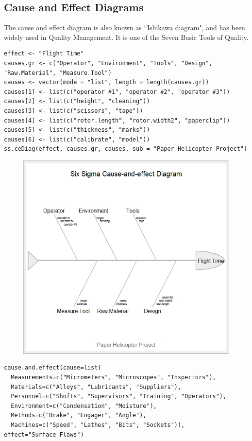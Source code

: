 \documentclass[]{article}
\begin{document}
\subsection{Cause and Effect Diagrams}
The cause and effect diagram is also known as ``Ishikawa diagram", and has been widely used in
Quality Management. It is one of the Seven Basic Tools of Quality.
\begin{framed}
\begin{verbatim}
effect <- "Flight Time"
causes.gr <- c("Operator", "Environment", "Tools", "Design",
"Raw.Material", "Measure.Tool")
causes <- vector(mode = "list", length = length(causes.gr))
causes[1] <- list(c("operator #1", "operator #2", "operator #3"))
causes[2] <- list(c("height", "cleaning"))
causes[3] <- list(c("scissors", "tape"))
causes[4] <- list(c("rotor.length", "rotor.width2", "paperclip"))
causes[5] <- list(c("thickness", "marks"))
causes[6] <- list(c("calibrate", "model"))
ss.ceDiag(effect, causes.gr, causes, sub = "Paper Helicopter Project")
\end{verbatim}
\end{framed}
\begin{figure}[h!]
\centering
\includegraphics[width=0.7\linewidth]{./Rplot03}
\caption{}
\label{fig:Rplot03}
\end{figure}
\begin{framed}
\begin{verbatim}
cause.and.effect(cause=list(
  Measurements=c("Micrometers", "Microscopes", "Inspectors"),
  Materials=c("Alloys", "Lubricants", "Suppliers"),
  Personnel=c("Shofts", "Supervisors", "Training", "Operators"),
  Environment=c("Condensation", "Moisture"),
  Methods=c("Brake", "Engager", "Angle"),
  Machines=c("Speed", "Lathes", "Bits", "Sockets")),
effect="Surface Flaws")
\end{verbatim}
\end{framed}
\end{document}
